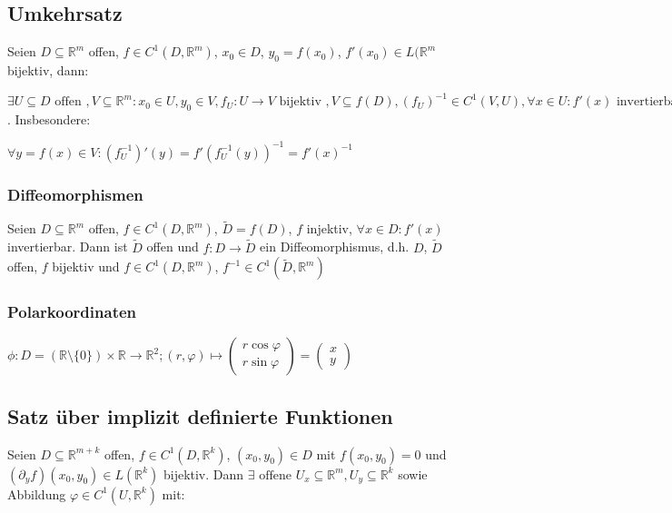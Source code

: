 \subsection*{Umkehrsatz}

Seien $D \subseteq \mathbb{R}^m$ offen, $f \in C^1(D, \mathbb{R}^m)$, $x_0 \in D$, $y_0 = f(x_0)$, $f'(x_0) \in L(\mathbb{R}^m$ bijektiv, dann:

$\exists U \subseteq D \text{ offen }, V \subseteq \mathbb{R}^m : x_0 \in U, y_0 \in V, f_U : U \rightarrow V \text{ bijektiv }, V \subseteq f(D), (f_U)^{-1} \in C^1(V, U), \forall x \in U : f'(x) \text{ invertierbar}$. Insbesondere:

$\forall y=f(x) \in V : (f_U^{-1})'(y) = f'(f_U^{-1}(y))^{-1} = f'(x)^{-1}$

\subsubsection*{Diffeomorphismen}

Seien $D \subseteq \mathbb{R}^m$ offen, $f \in C^1(D, \mathbb{R}^m)$, $\tilde D = f(D)$, $f$ injektiv, $\forall x \in D: f'(x)$ invertierbar. Dann ist $\tilde D$ offen und $f : D \rightarrow \tilde D$ ein Diffeomorphismus, d.h. $D$, $\tilde D$ offen, $f$ bijektiv und $f \in C^1(D, \mathbb{R}^m)$, $f^{-1} \in C^1(\tilde D, \mathbb{R}^m)$

\subsubsection*{Polarkoordinaten}

$\phi : D = (\mathbb{R} \setminus \{0\}) \times \mathbb{R} \rightarrow \mathbb{R}^2; (r, \varphi) \mapsto \begin{pmatrix} r \cos \varphi \\ r \sin \varphi \end{pmatrix} = \begin{pmatrix} x \\ y \end{pmatrix}$

\subsection*{Satz über implizit definierte Funktionen}

Seien $D \subseteq \mathbb{R}^{m+k}$ offen, $f \in C^1(D, \mathbb{R}^k)$, $(x_0, y_0) \in D$ mit $f(x_0, y_0) = 0$ und $(\partial_y f)(x_0, y_0) \in L(\mathbb{R}^k)$ bijektiv. Dann $\exists \text{ offene } U_x \subseteq \mathbb{R}^m, U_y \subseteq \mathbb{R}^k$ sowie Abbildung $\varphi \in C^1(U, \mathbb{R}^k)$ mit:

